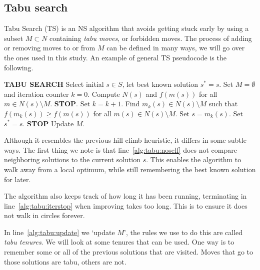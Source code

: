 \subsection{Tabu search}\label{sec:tabu}
Tabu Search (TS) is an NS algorithm that avoids getting stuck early by using a subset $M \subset N$ containing \emph{tabu moves}, or forbidden moves. The process of adding or removing moves to or from $M$ can be defined in many ways, we will go over the ones used in this study. An example of general TS pseudocode is the following.

\hfill

\begin{algorithmic}[1]
    \BeginBox
    \Statex \textbf{TABU SEARCH}
    \State Select initial $s\in S$, let best known solution $s^* = s$.
    \State Set $M = \emptyset$ and iteration counter $k=0$.
    \Loop
    \State Compute $N(s)$ and $f(m(s))$ for all $m\in N(s) \setminus M$.
     \textbf{STOP}.
    \EndIf
    \State Set $k= k+1$.
    \State Find $m_k(s) \in N(s)\setminus M$ such that $f(m_k(s)) \geq f(m(s))$ for all $m(s) \in N(s)\setminus M$. \label{alg:tabu:noself}
    \State Set $s = m_k(s)$.
    \State Set $s^* = s$. 
    \EndIf
     \label{alg:tabu:iterstop}
    \State \textbf{STOP}
    \EndIf
    \State Update $M$. \label{alg:tabu:update}
    \EndLoop
    \EndBox
\end{algorithmic}

\hfill

Although it resembles the previous hill climb heuristic, it differs in some subtle ways. The first thing we note is that line~\ref{alg:tabu:noself} does not compare neighboring solutions to the current solution $s$. This enables the algorithm to walk away from a local optimum, while still remembering the best known solution for later.

The algorithm also keeps track of how long it has been running, terminating in line~\ref{alg:tabu:iterstop} when improving takes too long. This is to ensure it does not walk in circles forever.

In line~\ref{alg:tabu:update} we `update $M$', the rules we use to do this are called \emph{tabu tenures}. We will look at some tenures that can be used. One way is to remember some or all of the previous solutions that are visited. Moves that go to those solutions are tabu, others are not.

